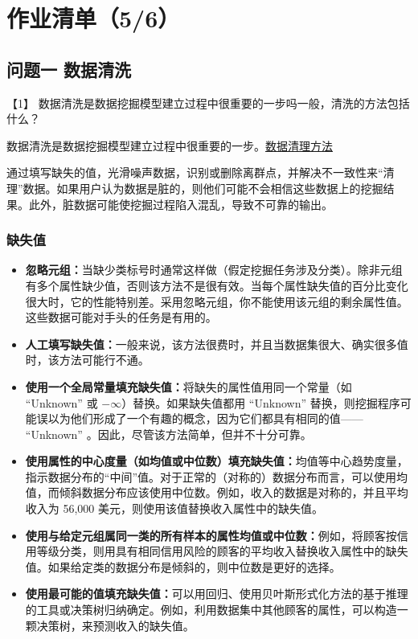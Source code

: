 \documentclass[11pt]{article}
\providecommand{\tightlist}{%
      \setlength{\itemsep}{0pt}\setlength{\parskip}{0pt}}
\begin{document}
    \hypertarget{ux4f5cux4e1aux6e05ux535556}{%
\section{作业清单（5/6）}\label{ux4f5cux4e1aux6e05ux535556}}

    \hypertarget{ux95eeux9898ux4e00-ux6570ux636eux6e05ux6d17}{%
\subsection{问题一
数据清洗}\label{ux95eeux9898ux4e00-ux6570ux636eux6e05ux6d17}}

    【1】
数据清洗是数据挖掘模型建立过程中很重要的一步吗一般，清洗的方法包括什么？

    数据清洗是数据挖掘模型建立过程中很重要的一步。\href{https://zhuanlan.zhihu.com/p/40775756}{数据清理方法}

    通过填写缺失的值，光滑噪声数据，识别或删除离群点，并解决不一致性来``清理''数据。如果用户认为数据是脏的，则他们可能不会相信这些数据上的挖掘结果。此外，脏数据可能使挖掘过程陷入混乱，导致不可靠的输出。

    \hypertarget{ux7f3aux5931ux503c}{%
\subsubsection{缺失值}\label{ux7f3aux5931ux503c}}

    \begin{itemize}
\tightlist
\item
  \textbf{忽略元组：}当缺少类标号时通常这样做（假定挖掘任务涉及分类）。除非元组有多个属性缺少值，否则该方法不是很有效。当每个属性缺失值的百分比变化很大时，它的性能特别差。采用忽略元组，你不能使用该元组的剩余属性值。这些数据可能对手头的任务是有用的。
\item
  \textbf{人工填写缺失值：}一般来说，该方法很费时，并且当数据集很大、确实很多值时，该方法可能行不通。
\item
  \textbf{使用一个全局常量填充缺失值：}将缺失的属性值用同一个常量（如
  ``Unknown'' 或 \(-\infty\)）替换。如果缺失值都用 ``Unknown''
  替换，则挖掘程序可能误以为他们形成了一个有趣的概念，因为它们都具有相同的值------
  ``Unknown'' 。因此，尽管该方法简单，但并不十分可靠。
\item
  \textbf{使用属性的中心度量（如均值或中位数）填充缺失值：}均值等中心趋势度量，指示数据分布的``中间''值。对于正常的（对称的）数据分布而言，可以使用均值，而倾斜数据分布应该使用中位数。例如，收入的数据是对称的，并且平均收入为
  56,000 美元，则使用该值替换收入属性中的缺失值。
\item
  \textbf{使用与给定元组属同一类的所有样本的属性均值或中位数：}例如，将顾客按信用等级分类，则用具有相同信用风险的顾客的平均收入替换收入属性中的缺失值。如果给定类的数据分布是倾斜的，则中位数是更好的选择。
\item
  \textbf{使用最可能的值填充缺失值：}可以用回归、使用贝叶斯形式化方法的基于推理的工具或决策树归纳确定。例如，利用数据集中其他顾客的属性，可以构造一颗决策树，来预测收入的缺失值。
\end{itemize}
\end{document}
